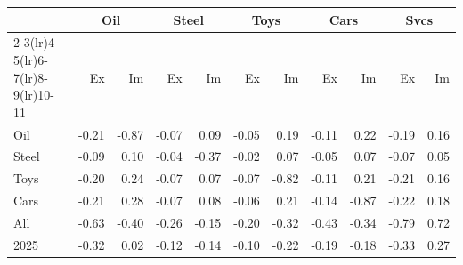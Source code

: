\begin{tabular}{lrrrrrrrrrr}
\toprule
 & \multicolumn{2}{c}{Oil} & \multicolumn{2}{c}{Steel} & \multicolumn{2}{c}{Toys} & \multicolumn{2}{c}{Cars} & \multicolumn{2}{c}{Svcs} \\
\cmidrule(lr){2-3}\cmidrule(lr){4-5}\cmidrule(lr){6-7}\cmidrule(lr){8-9}\cmidrule(lr){10-11}
 & Ex & Im & Ex & Im & Ex & Im & Ex & Im & Ex & Im \\
\midrule
Oil & -0.21 & -0.87 & -0.07 & 0.09 & -0.05 & 0.19 & -0.11 & 0.22 & -0.19 & 0.16 \\
Steel & -0.09 & 0.10 & -0.04 & -0.37 & -0.02 & 0.07 & -0.05 & 0.07 & -0.07 & 0.05 \\
Toys & -0.20 & 0.24 & -0.07 & 0.07 & -0.07 & -0.82 & -0.11 & 0.21 & -0.21 & 0.16 \\
Cars & -0.21 & 0.28 & -0.07 & 0.08 & -0.06 & 0.21 & -0.14 & -0.87 & -0.22 & 0.18 \\
All & -0.63 & -0.40 & -0.26 & -0.15 & -0.20 & -0.32 & -0.43 & -0.34 & -0.79 & 0.72 \\
2025 & -0.32 & 0.02 & -0.12 & -0.14 & -0.10 & -0.22 & -0.19 & -0.18 & -0.33 & 0.27 \\
\bottomrule
\end{tabular}
